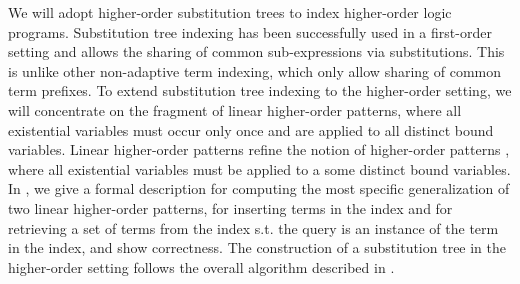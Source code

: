 \documentclass{llncs}
\begin{document}
We will adopt higher-order substitution trees
\cite{Pientka:ICLP03,Pientka03phd} to index higher-order logic
programs. Substitution tree indexing has been successfully used in a
first-order setting \cite{Graf+Book95} and  allows the sharing of
common sub-expressions via substitutions. This is unlike other
non-adaptive term indexing, which only allow sharing of common term
prefixes. To extend substitution tree indexing to the higher-order
setting, we will concentrate on the fragment of linear higher-order
patterns\cite{PientkaPfenning:CADE03}, where all existential variables
must occur only once and are applied to all distinct bound
variables. Linear higher-order patterns refine the notion of
higher-order patterns  \cite{Miller91iclp}, where all existential
variables must be applied to a some distinct bound variables.  In
\cite{Pientka:ICLP03,Pientka03phd}, we give a formal description for
computing the most specific generalization of two linear higher-order
patterns, for inserting terms in the index and for retrieving a set of
terms from the index s.t. the query is an instance of the term in the
index, and show correctness. The construction of a substitution tree
in the higher-order setting follows the overall algorithm described in
\cite{Ramakrishnan01:indexing}. 

\end{document}
